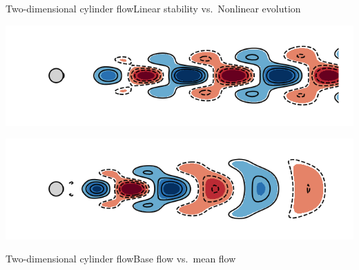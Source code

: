 \documentclass[usenames,dvipsnames,svgnames,10pt,aspectratio=169]{beamer}
\begin{document}
\begin{frame}[t, c]{Two-dimensional cylinder flow}{Linear stability vs.\ Nonlinear evolution}
  \begin{minipage}{.48\textwidth}
    \centering

    \includegraphics[width=\textwidth]{stability_mode}
  \end{minipage}%
  \hfill
  \begin{minipage}{.48\textwidth}
    \centering

    \includegraphics[width=\textwidth]{pod_mode}
  \end{minipage}

  \medskip

  \begin{minipage}{.48\textwidth}
  \end{minipage}%
  \hfill
  \begin{minipage}{.48\textwidth}
  \end{minipage}

\end{frame}





\begin{frame}[t, c]{Two-dimensional cylinder flow}{Base flow vs.\ mean flow}
  \begin{minipage}{.48\textwidth}
    \centering
  \end{minipage}%
  \hfill
  \begin{minipage}{.48\textwidth}
    \centering
  \end{minipage}

  \medskip

  \begin{minipage}{.48\textwidth}
  \end{minipage}%
  \hfill
  \begin{minipage}{.48\textwidth}
  \end{minipage}

\end{frame}
\end{document}

